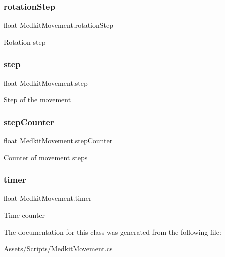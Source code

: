 \subsubsection{\texorpdfstring{rotationStep}{rotationStep}}
{\footnotesize\ttfamily float Medkit\+Movement.\+rotation\+Step}

Rotation step \mbox{\label{class_medkit_movement_aa9a091704ce4a8e72975c5ea3d7b0df2}} 
\subsubsection{\texorpdfstring{step}{step}}
{\footnotesize\ttfamily float Medkit\+Movement.\+step}

Step of the movement \mbox{\label{class_medkit_movement_a71a2c2d41c182da83c7e901d7cbff4b7}} 
\subsubsection{\texorpdfstring{stepCounter}{stepCounter}}
{\footnotesize\ttfamily float Medkit\+Movement.\+step\+Counter\hspace{0.3cm}{\ttfamily [private]}}

Counter of movement steps \mbox{\label{class_medkit_movement_a780055e963b3abbab73ff15b76d17301}} 
\subsubsection{\texorpdfstring{timer}{timer}}
{\footnotesize\ttfamily float Medkit\+Movement.\+timer\hspace{0.3cm}{\ttfamily [private]}}

Time counter 

The documentation for this class was generated from the following file\+:\begin{DoxyCompactItemize}
\item 
Assets/\+Scripts/\mbox{\hyperlink{_medkit_movement_8cs}{Medkit\+Movement.\+cs}}\end{DoxyCompactItemize}
